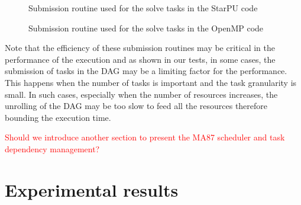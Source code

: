 \documentclass{article}
\newcommand{\alert}[1]{\textcolor{red}{#1}\xspace}
\newcommand{\starpu}{{StarPU}\xspace}
\newcommand{\openmp}{OpenMP\xspace}
\begin{document}
\begin{figure}[!h]
  \begin{minipage}{0.5\textwidth}
    \centering
    \lstset{basicstyle=\tt\scriptsize, language=C}
    
    \caption{\label{fig:spllt-starpu-slv-task} Submission routine used
      for the solve tasks in the \starpu code}
  \end{minipage}
  \hspace{0.5cm}
  \begin{minipage}{0.5\textwidth}
    \centering
    \lstset{basicstyle=\tt\scriptsize}
    
    \caption{\label{fig:spllt-omp-slv-task}Submission routine used
      for the solve tasks in the \openmp code}
  \end{minipage}
\end{figure}

Note that the efficiency of these submission routines may be critical
in the performance of the execution and as shown in our tests, in some
cases, the submission of tasks in the DAG may be a limiting factor for
the performance. This happens when the number of tasks is important
and the task granularity is small. In such cases, especially when the
number of resources increases, the unrolling of the DAG may be too
slow to feed all the resources therefore bounding the execution time.



\alert{Should we introduce another section to present the MA87
  scheduler and task dependency management?}

\section{Experimental results}\label{sec:experiments}
\end{document}
